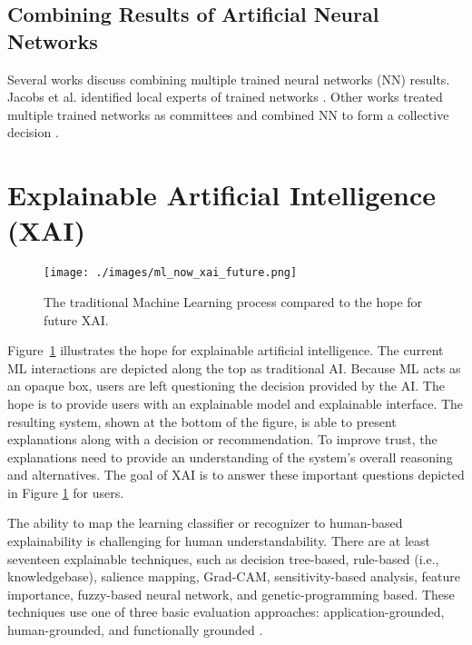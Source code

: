 \subsection{Combining Results of Artificial Neural Networks}


Several works discuss combining multiple trained neural networks (NN) results.
Jacobs et al. identified local experts of trained networks \cite{6797059}. Other
works treated multiple trained networks as committees and combined NN to form a
collective decision \cite{perrone1993putting, bishop1995neural,
sharkey1996combining}.

\section{Explainable Artificial Intelligence (XAI)}

\begin{figure}[h]
    \centering
    \texttt{[image: ./images/ml\_now\_xai\_future.png]}
    \caption{The traditional Machine Learning process compared to the hope for future XAI\cite{dw2019darpa}.}
    \label{fig:ml_now_xai_future}
\end{figure}

Figure~\ref{fig:ml_now_xai_future} illustrates the hope for explainable
artificial intelligence. The current ML interactions are depicted along the top
as traditional AI. Because ML acts as an opaque box, users are left questioning
the decision provided by the AI. The hope is to provide users with an explainable model and
explainable interface. The resulting system, shown at the bottom of the figure,
is able to present explanations along with a decision or recommendation. To
improve trust, the explanations need to provide an understanding of the system's
overall reasoning and alternatives. The goal of XAI is to answer these important
questions depicted in Figure \ref{fig:ml_now_xai_future} for
users\cite{dw2019darpa}.

The ability to map the learning classifier or recognizer to human-based
explainability is challenging for human understandability. There are at least
seventeen explainable techniques, such as decision tree-based, rule-based (i.e.,
knowledgebase), salience mapping, Grad-CAM, sensitivity-based analysis, feature
importance, fuzzy-based neural network, and genetic-programming based. These
techniques use one of three basic evaluation approaches: application-grounded,
human-grounded, and functionally grounded
\cite{Survey18,Fuzzy19,Hagras18,GP18,selvaraju2017grad,doshi2017towards}.


